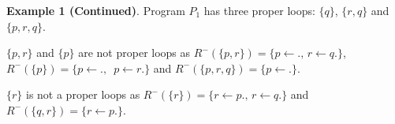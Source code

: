 \documentclass[landscape,final,a0paper,fontscale=0.285]{baposter}
\begin{document}
\begin{poster}
{    \smallskip
    {\bf Example 1 (Continued)}.
    Program $P_1$ has three proper loops: $\{q\}$,
    $\{r, q\}$ and $\{p, r, q\}$.

    $\{p, r\}$ and $\{p\}$ are not proper loops as $R^-(\{p, r\}) = \{{p\gets.},\,{r\gets q.}\}$, $R^-(\{p\}) = \{ {p\gets.}, \,$ ${p\gets r.}\}$ and $R^-(\{p, r, q\}) = \{ {p\gets.}\}$.

    $\{r\}$ is not a proper loops as $R^-(\{r\}) = \{ {r\gets p.},\, {r\gets q.}\}$ and $R^-(\{q, r\}) = \{ {r\gets p.}\}$.

   \vspace{0.3em}
  }

\end{poster}
\end{document}
